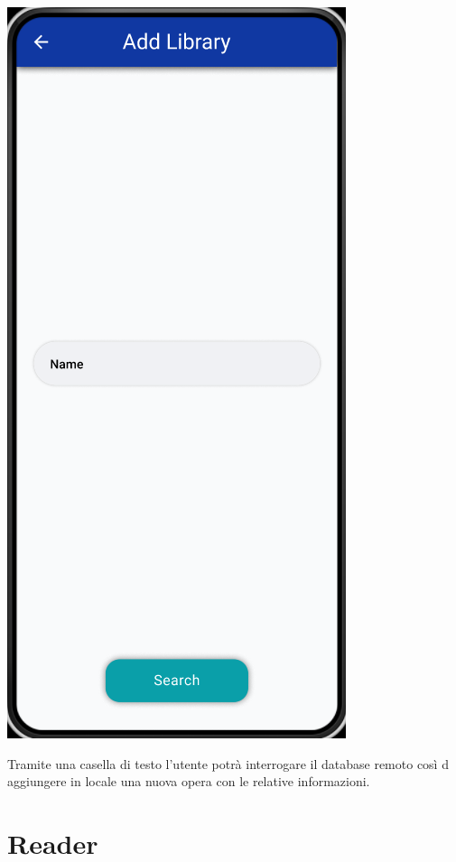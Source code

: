 \documentclass{report}
\begin{document}
\begin{center}
  \includegraphics[scale=0.4]{add_library.png}
\end{center}

Tramite una casella di testo l'utente potrà interrogare il database remoto così d aggiungere in locale una nuova opera con le relative informazioni.

\section{Reader}\label{sec:reader}
\end{document}
